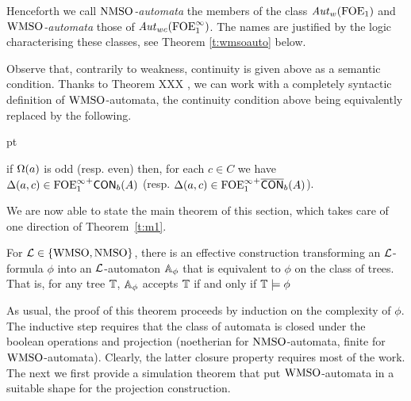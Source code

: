 Henceforth we call \emph{$\mathrm{NMSO}$-automata} the members of the class $\mathit{Aut}_{w}(\mathrm{FOE}_1)$ and \emph{$\mathrm{WMSO}$-automata} those of $\mathit{Aut}_{wc}(\mathrm{FOE}^{\infty}_1)$. The names are justified by the logic characterising these classes, see Theorem \ref{t:wmsoauto} below.

\begin{remark}
Observe that, contrarily to weakness, continuity is given above as a semantic condition. Thanks to Theorem XXX , we can work with a completely syntactic definition of $\mathrm{WMSO}$-automata, the continuity condition above being equivalently replaced by the following. 
\begin{description}
	 pt
	\item[(continuity, syntactically)] if $\Omega(a)$ is odd (resp. even) then, for each $c\in C$ we have
	   $\Delta(a,c) \in {\ensuremath{\mathrm{FOE}^{\infty}_1}}^+\mathsf{CON}_{b}(A)$ (resp. $\Delta(a,c) \in {\ensuremath{\mathrm{FOE}^{\infty}_1}}^+\overline{\mathsf{CON}}_{b}(A)$).
\end{description} 
\end{remark}

We are now able to state the main theorem of this section, which takes care of
one direction of Theorem~\ref{t:m1}. 

\begin{theorem}
\label{t:wmsoauto}
For $\mathcal{L} \in \{ \mathrm{WMSO}, \mathrm{NMSO}\}$, there is an effective construction transforming an $\mathcal{L}$-formula $\phi$
into an $\mathcal{L}$-automaton $\mathbb{A}_{\phi}$ that is equivalent
to $\phi$ on the class of trees.
That is, for any tree $\mathbb{T}$, $\mathbb{A}_{\phi}$ accepts $\mathbb{T}$ if and only if $\mathbb{T} \models {\phi}$
\end{theorem}

As usual, the proof of this theorem proceeds by induction on the complexity of
$\phi$. The inductive step requires that the class of automata is closed under the boolean operations and projection (noetherian for $\mathrm{NMSO}$-automata, finite for $\mathrm{WMSO}$-automata). Clearly, the latter closure property requires most of the work. The next we first
provide a simulation theorem that put $\mathrm{WMSO}$-automata in a suitable shape
for the projection construction.

